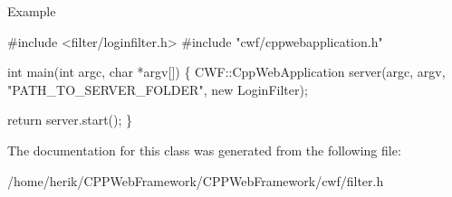 \begin{DoxyParagraph}{Example}
\begin{DoxyCode}
\textcolor{preprocessor}{#include <filter/loginfilter.h>}
\textcolor{preprocessor}{#include "cwf/cppwebapplication.h"}

\textcolor{keywordtype}{int} main(\textcolor{keywordtype}{int} argc, \textcolor{keywordtype}{char} *argv[])
\{
    CWF::CppWebApplication server(argc,
                                  argv,
                                  \textcolor{stringliteral}{"PATH\_TO\_SERVER\_FOLDER"},
                                  \textcolor{keyword}{new} LoginFilter);

    \textcolor{keywordflow}{return} server.start();
\}
\end{DoxyCode}
 
\end{DoxyParagraph}


The documentation for this class was generated from the following file\+:\begin{DoxyCompactItemize}
\item 
/home/herik/\+C\+P\+P\+Web\+Framework/\+C\+P\+P\+Web\+Framework/cwf/filter.\+h\end{DoxyCompactItemize}
